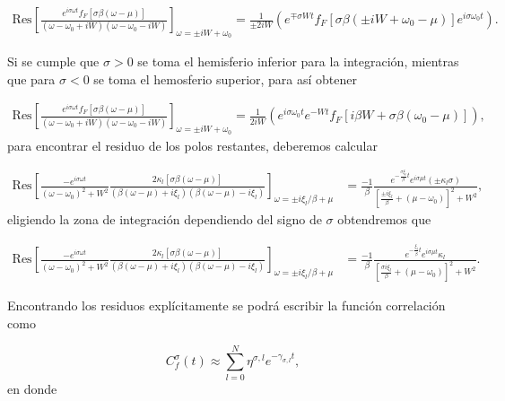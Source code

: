 \begin{appendixs}
\begin{align*}
   \text{Res} \left[ \frac{e^{ i\sigma \omega t} f_{F}[\sigma \beta (\omega-\mu)] }{ (\omega-\omega_{0} + iW)(\omega -\omega_{0} -iW)}\right]_{\omega = \pm i W + \omega_{0}} = \frac{1}{\pm 2iW} ( e^{\mp \sigma Wt} f_{F}[\sigma \beta(\pm iW +\omega_{0}-\mu)]e^{i\sigma \omega_{0}t}). 
\end{align*}

Si se cumple que $\sigma > 0$ se toma el hemisferio inferior para la integración, mientras que para $\sigma<0$ se toma el hemosferio superior, para así obtener 

\begin{align*}
    \text{Res} \left[ \frac{e^{ i\sigma \omega t} f_{F}[\sigma \beta (\omega-\mu)] }{ (\omega-\omega_{0} + iW)(\omega -\omega_{0} -iW)}\right]_{\omega = \pm i W + \omega_{0}} = \frac{1}{ 2iW} ( e^{i\sigma \omega_{0}t}e^{- Wt} f_{F}[i\beta W + \sigma \beta(\omega_{0}-\mu)]), 
 \end{align*}
para encontrar el residuo de los polos restantes, deberemos calcular 

\begin{align*}
    \text{Res} \left[ \frac{-e^{i\sigma \omega t}}{(\omega - \omega_{0})^{2} + W^{2} } \frac{ 2\kappa_{l}[\sigma \beta (\omega-\mu)] }{ (\beta(\omega-\mu) + i \xi_{l} )(\beta(\omega-\mu) - i \xi_{l})} \right]_{\omega = \pm i \xi_{l}/\beta + \mu} & = \frac{-1}{\beta} \frac{e^{- \frac{\sigma \xi_{l}}{\beta}t} e^{i\sigma \mu t}(\pm \kappa_{l}\sigma )}{ [ \frac{ \pm i\xi_{l}}{\beta} + (\mu - \omega_{0}) ]^{2} + W^{2} } ,
\end{align*}
eligiendo la zona de integración dependiendo del signo de $\sigma$ obtendremos que 

\begin{align*}
    \text{Res} \left[ \frac{-e^{i\sigma \omega t}}{(\omega - \omega_{0})^{2} + W^{2} } \frac{ 2\kappa_{l}[\sigma \beta (\omega-\mu)] }{ (\beta(\omega-\mu) + i \xi_{l} )(\beta(\omega-\mu) - i \xi_{l})} \right]_{\omega = \pm i \xi_{l}/\beta + \mu} & = \frac{-1}{\beta} \frac{e^{- \frac{ \xi_{l}}{\beta}t} e^{i\sigma \mu t} \kappa_{l} }{ [ \frac{ \sigma i\xi_{l}}{\beta} + (\mu - \omega_{0}) ]^{2} + W^{2} }. 
\end{align*}

Encontrando los residuos explícitamente se podrá escribir la función correlación como

\begin{equation}
    C^{\sigma}_{f}(t) \approx \sum_{l=0}^{N} \eta^{\sigma,l} e^{-\gamma_{\sigma,l} t},
    \label{correlationf}
\end{equation}
en donde 


\end{appendixs}
